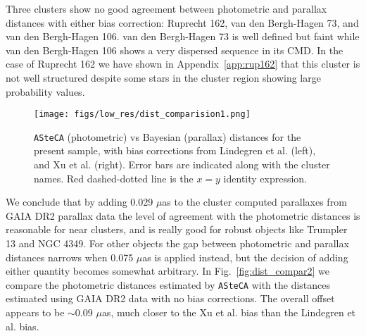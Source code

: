 \documentclass{aa}
\begin{document}
Three clusters show no good agreement between photometric and parallax distances
with either bias correction: Ruprecht 162, van den Bergh-Hagen 73, and van den
Bergh-Hagen 106. van den Bergh-Hagen 73 is well defined but faint while
van den Bergh-Hagen 106 shows a very dispersed sequence in its CMD.
In the case of Ruprecht 162 we have shown in Appendix~\ref{app:rup162} that this
cluster is not well structured despite some stars in the cluster region showing
large probability values.


\begin{figure*}[ht]
    \centering
    \texttt{[image: figs/low\_res/dist\_comparision1.png]}
    \caption{\texttt{ASteCA} (photometric) vs Bayesian (parallax) distances for
    the present sample, with bias corrections from Lindegren et al. (left), and
    Xu et al. (right). Error bars are indicated along with the cluster
    names. Red dashed-dotted line is the $x = y$ identity expression.}
    \label{fig67}
\end{figure*}

We conclude that by adding 0.029 $\mu$as to the cluster computed parallaxes from
GAIA DR2 parallax data the level of agreement with the photometric distances is
reasonable for near clusters, and is really good for robust objects like
Trumpler 13 and NGC 4349.
For other objects the gap between photometric and parallax distances narrows
when 0.075 $\mu$as is applied instead, but the decision of adding
either quantity becomes somewhat arbitrary.
In Fig.~\ref{fig:dist_compar2} we compare the photometric distances
estimated by \texttt{ASteCA} with the distances estimated using GAIA DR2 data
with no bias corrections. The overall offset
appears to be $\sim0.09$ $\mu$as, much closer to the Xu et al. bias than the
Lindegren et al. bias.\\
\end{document}
